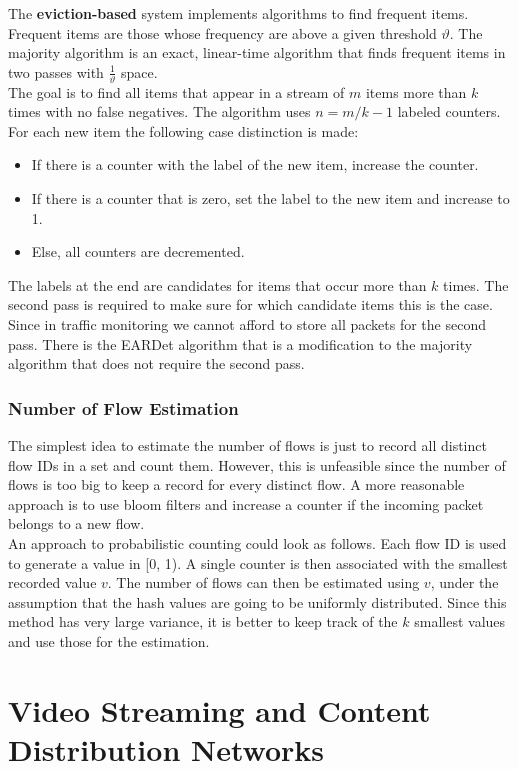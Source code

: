 The \textbf{eviction-based} system implements algorithms to find frequent items. Frequent items are those whose frequency are above a given threshold $\vartheta$. The majority algorithm is an exact, linear-time algorithm that finds frequent items in two passes with $\frac{1}{\vartheta}$ space.\\
The goal is to find all items that appear in a stream of $m$ items more than $k$ times with no false negatives. The algorithm uses $n = m/k - 1$ labeled counters. For each new item the following case distinction is made:
\begin{itemize}
\item If there is a counter with the label of the new item, increase the counter.
\item If there is a counter that is zero, set the label to the new item and increase to 1.
\item Else, all counters are decremented.
\end{itemize}
The labels at the end are candidates for items that occur more than $k$ times. The second pass is required to make sure for which candidate items this is the case. Since in traffic monitoring we cannot afford to store all packets for the second pass. There is the EARDet algorithm that is a modification to the majority algorithm that does not require the second pass.

\subsubsection{Number of Flow Estimation}
The simplest idea to estimate the number of flows is just to record all distinct flow IDs in a set and count them. However, this is unfeasible since the number of flows is too big to keep a record for every distinct flow. A more reasonable approach is to use bloom filters and increase a counter if the incoming packet belongs to a new flow. \vspace{.3cm}\\

An approach to probabilistic counting could look as follows. Each flow ID is used to generate a value in [0, 1). A single counter is then associated with the smallest recorded value $v$. The number of flows can then be estimated using $v$, under the assumption that the hash values are going to be uniformly distributed. Since this method has very large variance, it is better to keep track of the $k$ smallest values and use those for the estimation.

\section{Video Streaming and Content Distribution Networks}


